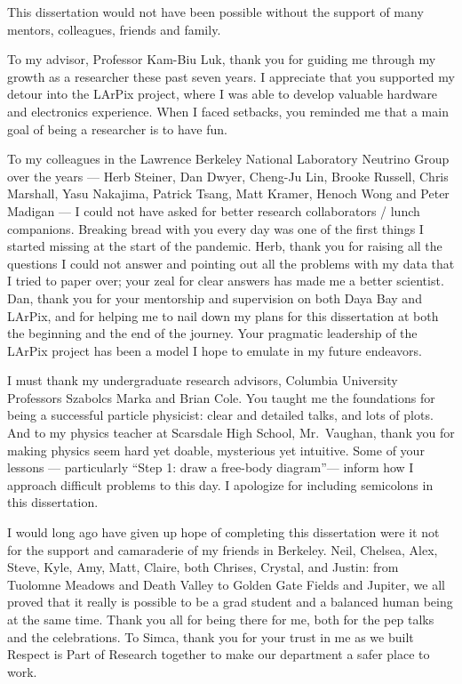 \begin{acknowledgements}


    This dissertation would not have been possible
    without the support of many mentors, colleagues, friends and family.

    To my advisor, Professor Kam-Biu Luk,
    thank you for guiding me through my growth as a researcher these past seven years.
    I appreciate that you supported my detour into the LArPix project,
    where I was able to develop valuable hardware and electronics experience.
    When I faced setbacks, you reminded me that
    a main goal of being a researcher is to have fun.

    To my colleagues in the Lawrence Berkeley National Laboratory Neutrino Group over the years ---
    Herb Steiner, Dan Dwyer, Cheng-Ju Lin, Brooke Russell, Chris Marshall,
    Yasu Nakajima, Patrick Tsang, Matt Kramer, Henoch Wong and Peter Madigan ---
    I could not have asked for better research collaborators / lunch companions.
    Breaking bread with you every day was one of the first things I started missing
    at the start of the pandemic.
    Herb, thank you for raising all the questions I could not answer
    and pointing out all the problems with my data that I tried to paper over;
    your zeal for clear answers has made me a better scientist.
    Dan, thank you for your mentorship and supervision
    on both Daya Bay and LArPix,
    and for helping me to nail down my plans for this dissertation
    at both the beginning and the end of the journey.
    Your pragmatic leadership of the LArPix project has been a model
    I hope to emulate in my future endeavors.

    I must thank my undergraduate research advisors,
    Columbia University Professors Szabolcs Marka and Brian Cole.
    You taught me the foundations for being a successful particle physicist:
    clear and detailed talks, and lots of plots.
    And to my physics teacher at Scarsdale High School, Mr.~Vaughan,
    thank you for making physics seem hard yet doable,
    mysterious yet intuitive.
    Some of your lessons --- particularly ``Step 1: draw a free-body diagram''---
    inform how I approach difficult problems to this day.
    I apologize for including semicolons in this dissertation.

    I would long ago have given up hope of completing this dissertation
    were it not for the support and camaraderie of my friends in Berkeley.
    Neil, Chelsea, Alex, Steve, Kyle, Amy, Matt, Claire, both Chrises, Crystal,
    and Justin:
    from Tuolomne Meadows and Death Valley to Golden Gate Fields and Jupiter,
    we all proved that it really is possible to be a grad student
    and a balanced human being at the same time.
    Thank you all for being there for me, both for the pep talks
    and the celebrations.
    To Simca, thank you for your trust in me as we built
    Respect is Part of Research together to make our department
    a safer place to work.


\end{acknowledgements}
